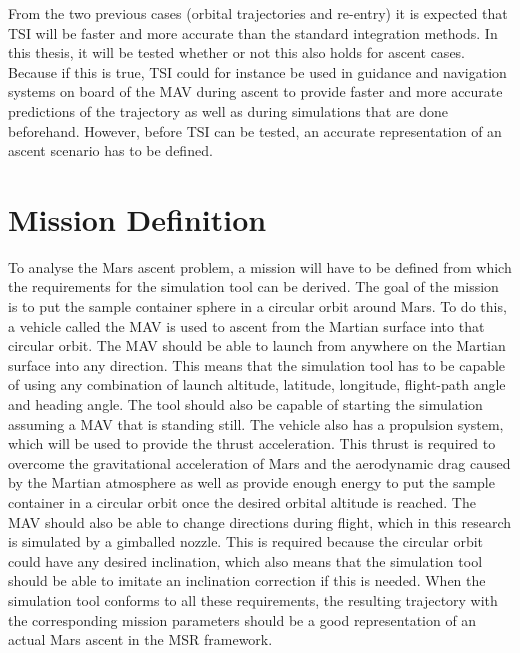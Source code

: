 From the two previous cases (orbital trajectories and re-entry) it is expected that \ac{TSI} will be faster and more accurate than the standard integration methods. In this thesis, it will be tested whether or not this also holds for ascent cases. Because if this is true, \ac{TSI} could for instance be used in guidance and navigation systems on board of the \ac{MAV} during ascent to provide faster and more accurate predictions of the trajectory as well as during simulations that are done beforehand. However, before \ac{TSI} can be tested, an accurate representation of an ascent scenario has to be defined. 
 


\section{Mission Definition}
\label{sec:missionDefinition}
To analyse the Mars ascent problem, a mission will have to be defined from which the requirements for the simulation tool can be derived. The goal of the mission is to put the sample container sphere in a circular orbit around Mars. To do this, a vehicle called the \ac{MAV} is used to ascent from the Martian surface into that circular orbit. The \ac{MAV} should be able to launch from anywhere on the Martian surface into any direction. This means that the simulation tool has to be capable of using any combination of launch altitude, latitude, longitude, flight-path angle and heading angle. The tool should also be capable of starting the simulation assuming a \ac{MAV} that is standing still. The vehicle also has a propulsion system, which will be used to provide the thrust acceleration. This thrust is required to overcome the gravitational acceleration of Mars and the aerodynamic drag caused by the Martian atmosphere as well as provide enough energy to put the sample container in a circular orbit once the desired orbital altitude is reached. The \ac{MAV} should also be able to change directions during flight, which in this research is simulated by a gimballed nozzle. This is required because the circular orbit could have any desired inclination, which also means that the simulation tool should be able to imitate an inclination correction if this is needed. When the simulation tool conforms to all these requirements, the resulting trajectory with the corresponding mission parameters should be a good representation of an actual Mars ascent in the \ac{MSR} framework. 


